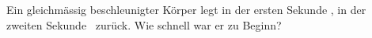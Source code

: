 Ein gleichmässig beschleunigter Körper legt in der ersten Sekunde \sEaO, in der zweiten Sekunde \sEbO\ zurück. Wie schnell war er zu Beginn?
